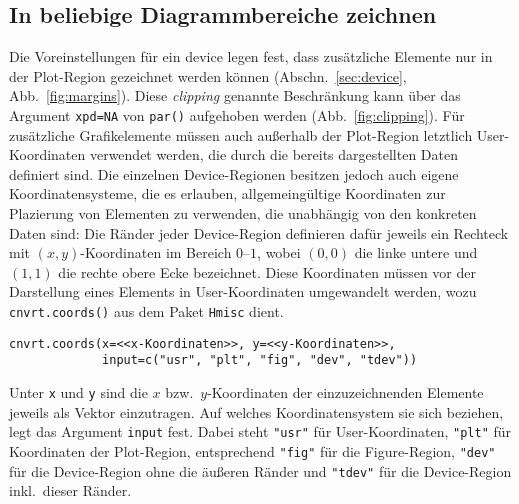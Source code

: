 \subsection{In beliebige Diagrammbereiche zeichnen}
\label{sec:clipping}

Die Voreinstellungen für ein device legen fest, dass zusätzliche Elemente nur in der Plot-Region gezeichnet werden können (Abschn.\ \ref{sec:device}, Abb.\ \ref{fig:margins}). Diese \emph{clipping} genannte Beschränkung kann über das Argument \lstinline!xpd=NA! von \lstinline!par()! aufgehoben werden (Abb.\ \ref{fig:clipping}). Für zusätzliche Grafikelemente müssen auch außerhalb der Plot-Region letztlich User-Koordinaten verwendet werden, die durch die bereits dargestellten Daten definiert sind. Die einzelnen Device-Regionen besitzen jedoch auch eigene Koordinatensysteme, die es erlauben, allgemeingültige Koordinaten zur Plazierung von Elementen zu verwenden, die unabhängig von den konkreten Daten sind: Die Ränder jeder Device-Region definieren dafür jeweils ein Rechteck mit $(x, y)$-Koordinaten im Bereich $0$--$1$, wobei $(0, 0)$ die linke untere und $(1, 1)$ die rechte obere Ecke bezeichnet. Diese Koordinaten müssen vor der Darstellung eines Elements in User-Koordinaten umgewandelt werden, wozu \lstinline!cnvrt.coords()! aus dem Paket \lstinline!Hmisc! dient.
\begin{lstlisting}
cnvrt.coords(x=<<x-Koordinaten>>, y=<<y-Koordinaten>>,
             input=c("usr", "plt", "fig", "dev", "tdev"))
\end{lstlisting}

Unter \lstinline!x! und \lstinline!y! sind die $x$ bzw.\ $y$-Koordinaten der einzuzeichnenden Elemente jeweils als Vektor einzutragen. Auf welches Koordinatensystem sie sich beziehen, legt das Argument \lstinline!input! fest. Dabei steht \lstinline!"usr"! für User-Koordinaten, \lstinline!"plt"! für Koordinaten der Plot-Region, entsprechend \lstinline!"fig"! für die Figure-Region, \lstinline!"dev"! für die Device-Region ohne die äußeren Ränder und \lstinline!"tdev"! für die Device-Region inkl.\ dieser Ränder.

